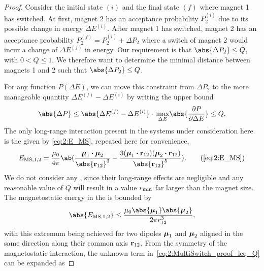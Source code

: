 \begin{proof}
	Consider the initial state $(i)$ and the final state $(f)$ where magnet 1 has switched.
	At first, magnet 2 has an acceptance probability $P_2^{(i)}$ due to its possible change in energy $\Delta E^{(i)}$.
	After magnet 1 has switched, magnet 2 has an acceptance probability $P_2^{(f)} = P_2^{(i)} + \Delta P_2$ where a switch of magnet 2 would incur a change of $\Delta E^{(f)}$ in energy.
	Our requirement is that $\abs{\Delta P_2} \leq Q$, with $0 < Q \leq 1$.
	We therefore want to determine the minimal distance between magnets 1 and 2 such that $\abs{\Delta P_2} \leq Q$. \par
	For any function $P(\Delta E)$, we can move this constraint from $\Delta P_2$ to the more manageable quantity $\Delta E^{(f)} - \Delta E^{(i)}$ by writing the upper bound
	\begin{equation}
		\abs{\Delta P} \leq \abs{\Delta E^{(f)} - \Delta E^{(i)}} \cdot \, \underset{\Delta E}{\max} \abs{\frac{\partial P}{\partial \Delta E}} \leq Q \mathrm{.}
		\label{eq:2:MultiSwitch_proof_leq_Q}
	\end{equation}
	The only long-range interaction present in the systems under consideration here is the  given by \eqref{eq:2:E_MS}, repeated here for convenience,
	\begin{equation*}
		E_{\mathrm{MS},1,2} = \frac{\mu_0}{4 \pi} \ab(\frac{\vc{\mu}_1 \bcdot \vc{\mu}_2}{\abs{\vc{r}_{12}}^3} - \frac{3(\vc{\mu}_1 \bcdot \vc{r}_{12}) (\vc{\mu}_2 \bcdot \vc{r}_{12})}{\abs{\vc{r}_{12}}^5}) \mathrm{.}  \tag{\ref*{eq:2:E_MS}}
	\end{equation*}
	We do not consider any , since their long-range effects are negligible and any reasonable value of $Q$ will result in a value $r_\mathrm{min}$ far larger than the magnet size.
	The magnetostatic energy in the  is bounded by
	\begin{equation}
		\abs{E_{\mathrm{MS},1,2}} \leq \frac{\mu_0 \abs{\vc{\mu}_1} \abs{\vc{\mu}_2}}{2 \pi r_{12}^3} \mathrm{,}
		\label{eq:2:MultiSwitch_proof_EMS_leq}
	\end{equation}
	with this extremum being achieved for two dipoles $\boldsymbol{\mathbf{\mu}}_1$ and $\boldsymbol{\mathbf{\mu}}_2$ aligned in the same direction along their common axis $\boldsymbol{\mathbf{r}}_{12}$.
	From the symmetry of the magnetostatic interaction, %
	the unknown term in~\cref{eq:2:MultiSwitch_proof_leq_Q} can be expanded as 

\end{proof}
